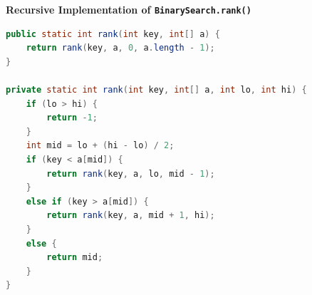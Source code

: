 \documentclass[8pt,a4paper,compress]{beamer}
\begin{document}
\begin{frame}[fragile]
\pause

\textbf{Recursive Implementation of \lstinline$BinarySearch.rank()$}

\begin{lstlisting}[language=Java]
public static int rank(int key, int[] a) { 
    return rank(key, a, 0, a.length - 1);
}

private static int rank(int key, int[] a, int lo, int hi) {
    if (lo > hi) {
        return -1;
    }
    int mid = lo + (hi - lo) / 2;
    if (key < a[mid]) {
        return rank(key, a, lo, mid - 1);
    }
    else if (key > a[mid]) {
        return rank(key, a, mid + 1, hi);
    }
    else {
        return mid;
    }
}
\end{lstlisting}

\end{frame}
\end{document}
